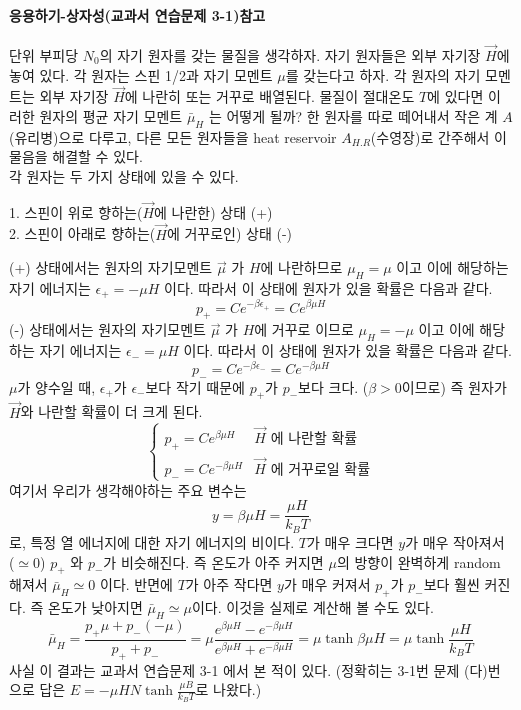 \documentclass[a4paper,12pt]{article}
\begin{document}
\paragraph{응용하기-상자성(교과서 연습문제 3-1)참고} 단위 부피당 $N_0$의 자기 원자를 갖는 물질을 생각하자. 자기 원자들은 외부 자기장 $\vec{H}$에 놓여 있다. 각 원자는 스핀 1/2과 자기 모멘트 $\mu$를 갖는다고 하자. 각 원자의 자기 모멘트는 외부 자기장 $\vec{H}$에 나란히 또는 거꾸로 배열된다. 물질이 절대온도 $T$에 있다면 이러한 원자의 평균 자기 모멘트 $\bar{\mu}_H$ 는 어떻게 될까? 한 원자를 따로 떼어내서 작은 계 $A$(유리병)으로 다루고, 다른 모든 원자들을 heat reservoir $A_{H.R}$(수영장)로 간주해서 이 물음을 해결할 수 있다. \\
각 원자는 두 가지 상태에 있을 수 있다. 
\begin{center}
1. 스핀이 위로 향하는($\vec{H}$에 나란한) 상태 (+)\\
2. 스핀이 아래로 향하는($\vec{H}$에 거꾸로인) 상태 (-)
\end{center}
(+) 상태에서는 원자의 자기모멘트 $\vec{\mu}$ 가 $H$에 나란하므로 $\mu_H=\mu$ 이고 이에 해당하는 자기 에너지는 $\epsilon_+=-\mu H$ 이다. 따라서 이 상태에 원자가 있을 확률은 다음과 같다. 
$$p_+=Ce^{-\beta \epsilon_+}=Ce^{\beta\mu H}$$ 
(-) 상태에서는 원자의 자기모멘트 $\vec{\mu}$ 가 $H$에 거꾸로 이므로 $\mu_H=-\mu$ 이고 이에 해당하는 자기 에너지는 $\epsilon_-=\mu H$ 이다. 따라서 이 상태에 원자가 있을 확률은 다음과 같다. 
$$p_-=Ce^{-\beta \epsilon_-}=Ce^{-\beta\mu H}$$ 
$\mu $가 양수일 때, $\epsilon_+$가 $\epsilon_-$보다 작기 때문에 $p_+$가 $p_-$보다 크다. ($\beta>0$이므로) 즉 원자가 $\vec{H}$와 나란할 확률이 더 크게 된다. 
$$\begin{cases}p_+=Ce^{\beta\mu H}&\vec{H}\mbox{ 에 나란할 확률 }\\p_-=Ce^{-\beta\mu H} &\vec{H}\mbox{ 에 거꾸로일 확률}
\end{cases}$$
여기서 우리가 생각해야하는 주요 변수는 
$$y=\beta \mu H=\frac{\mu H}{k_B T}$$
로, 특정 열 에너지에 대한 자기 에너지의 비이다. $T$가 매우 크다면 $y$가 매우 작아져서 ($\simeq 0$) $p_+$ 와 $p_-$가 비슷해진다. 즉 온도가 아주 커지면 $\mu$의 방향이 완벽하게 random해져서 $\bar{\mu}_{H}\simeq0$ 이다. 반면에 $T$가 아주 작다면 $y$가 매우 커져서 $p_+$가 $p_-$보다 훨씬 커진다. 즉 온도가 낮아지면 $\bar{\mu}_{H}\simeq\mu$이다. 이것을 실제로 계산해 볼 수도 있다. 
$$\bar{\mu}_H=\frac{p_+\mu+p_-(-\mu)}{p_++p_-}=\mu\frac{e^{\beta\mu H}-e^{-\beta\mu H}}{e^{\beta\mu H}+e^{-\beta\mu H}}=\mu \tanh \beta\mu H=\mu\tanh\frac{\mu H}{k_BT}$$
사실 이 결과는 교과서 연습문제 3-1 에서 본 적이 있다. (정확히는 3-1번 문제 (다)번으로 답은 $E=-\mu HN\tanh\frac{\mu B}{k_BT}$로 나왔다.)
\end{document}
